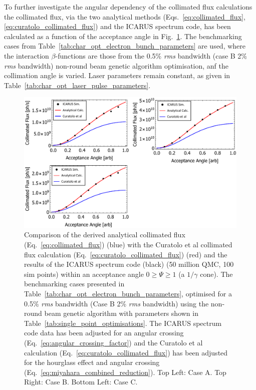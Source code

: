 \documentclass[../main.tex]{subfiles}
\begin{document}
To further investigate the angular dependency of the collimated flux calculations the collimated flux, via the two analytical methods (Eqs.~\ref{eq:collimated_flux}, \ref{eq:curatolo_collimated_flux}) and the \textsc{ICARUS} spectrum code, has been calculated as a function of the acceptance angle in Fig.~\ref{fig:curatolo_collimated_flux_comparison}. The benchmarking cases from Table~\ref{tab:char_opt_electron_bunch_parameters} are used, where the interaction $\beta$-functions are those from the 0.5\% \textit{rms} bandwidth (case B 2\% \textit{rms} bandwidth) non-round beam genetic algorithm optimisation, anf the collimation angle is varied. Laser parameters remain constant, as given in Table~\ref{tab:char_opt_laser_pulse_parameters}. 
  
\begin{figure}[!h]
\centering
\includegraphics[width=\textwidth]{Figures/Optimisation_and_Characterisation_of_Inverse_Compton_Scattering_Sources/Fcol_PSI_Cases_Curatolo_Analytical_ICARUS.pdf}
\caption{Comparison of the derived analytical collimated flux (Eq.~\ref{eq:collimated_flux}) (blue) with the Curatolo et al collimated flux calculation \cite{curatolo2017analytical}  (Eq.~\ref{eq:curatolo_collimated_flux}) (red) and the results of the \textsc{ICARUS} spectrum code (black) (50 million QMC, 100 sim points) within an acceptance angle $0 \geq \Psi \geq 1$ (a $1/\gamma$ cone). The benchmarking cases presented in Table~\ref{tab:char_opt_electron_bunch_parameters}, optimised for a 0.5\% \textit{rms} bandwidth (Case B 2\% \textit{rms} bandwidth) using the non-round beam genetic algorithm with parameters shown in Table~\ref{tab:single_point_optimisations}. The \textsc{ICARUS} spectrum code data has been adjusted for an angular crossing (Eq.~\ref{eq:angular_crossing_factor}) and the Curatolo et al calculation (Eq.~\ref{eq:curatolo_collimated_flux}) has been adjusted for the hourglass effect and angular crossing (Eq.~\ref{eq:miyahara_combined_reduction}). Top Left: Case A. Top Right: Case B. Bottom Left: Case C.}
\label{fig:curatolo_collimated_flux_comparison}
\end{figure}
\end{document}

